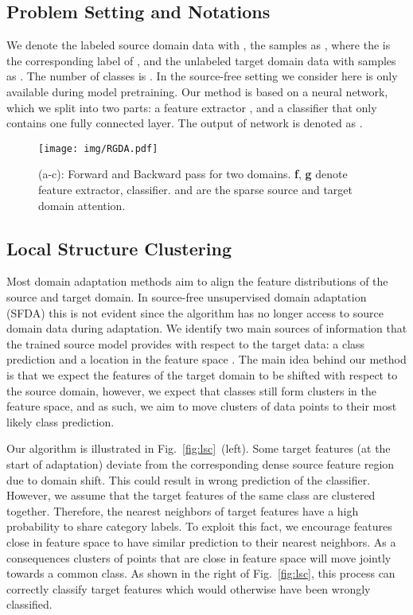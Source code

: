 \documentclass[10pt,twocolumn,letterpaper]{article}
\begin{document}
\subsection{Problem Setting and Notations}
We denote the labeled source domain data with , the samples as , where the  is the corresponding label of , and the unlabeled target domain data with  samples as . The number of classes is . In the source-free setting we consider here  is only available during model pretraining. Our method is based on a neural network, which we split into two parts: a feature extractor , and a classifier  that only contains one fully connected layer. The output of network is denoted as . 



\begin{figure*}[t]
	\centering
	\texttt{[image: img/RGDA.pdf]}
	\vspace{-3mm}
	\caption{(a-c): Forward and Backward pass for two domains. \textbf{f}, \textbf{g} denote feature extractor, classifier.  and  are the sparse source and target domain attention.\vspace{-2mm}}
	\label{fig:dal}
	\vspace{-2mm}
\end{figure*}

\subsection{Local Structure Clustering}
\label{sec: lsc}
Most domain adaptation methods aim to align the feature distributions of the source and target domain. In source-free unsupervised domain adaptation (SFDA) this is not evident since the algorithm has no longer access to source domain data during adaptation. We identify two main sources of information that the trained source model provides with respect to the target data: a class prediction  and a location in the feature space . The main idea behind our method is that we expect the features of the target domain to be shifted with respect to the source domain, however, we expect that classes still form clusters in the feature space, and as such, we aim to move clusters of data points to their most likely class prediction. 

Our algorithm is illustrated in Fig.~\ref{fig:lsc}~(left). Some target features (at the start of adaptation) deviate from the corresponding dense source feature region due to domain shift. This could result in wrong prediction of the classifier. However, we assume that the target features of the same class are clustered together. Therefore, the nearest neighbors of target features have a high probability to share category labels. To exploit this fact, we encourage features close in feature space to have similar prediction to their nearest neighbors. As a consequences clusters of points that are close in feature space will move jointly towards a common class. As shown in the right of Fig.~\ref{fig:lsc}, this process can correctly classify target features which would otherwise have been wrongly classified. 
\end{document}
